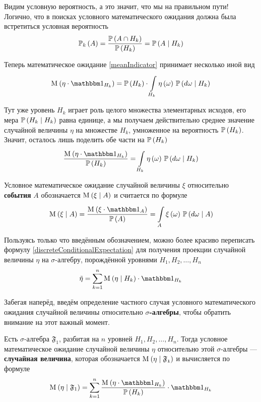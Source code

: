 Видим условную вероятность, а это значит, что мы на правильном пути!
Логично, что в поисках условного математического ожидания
должна была встретиться условная вероятность
$$\mathbb{P}_k\left( A \right)
    =\frac{\mathbb{P}\left( A\cap H_k \right)}{\mathbb{P}\left( H_k \right)}
    =\mathbb{P}\left( A \mid H_k \right)$$

Теперь математическое ожидание \eqref{meanIndicator}
принимает несколько иной вид
$$\mean{\left( \eta \cdot \indicatorof{H_k} \right)}
        = \probability{H_k}
            \cdot \integrall{H_k}{\probability{d\omega \mid H_k}}{
                \eta\left( \omega \right)}$$

Тут уже уровень $H_k$ играет роль целого множества элементарных исходов,
его мера $\mathbb{P}\left( H_k \mid H_k \right)$ равна единице,
а мы получаем действительно среднее значение случайной величины $\eta$
на множестве $H_k$, умноженное на вероятность $\mathbb{P}\left( H_k \right)$.
Значит, осталось лишь поделить обе части на $\mathbb{P}\left( H_k \right)$
$$\frac{\mean{\left( \eta \cdot \indicatorof{H_k} \right)}}{\probability{H_k}}
        = \integrall{H_k}{\probability{d\omega \mid H_k}}{
            \eta\left( \omega \right)}$$

\begin{definition}
Условное математическое
ожидание случайной величины $\xi$
относительно \textbf{события} $A$ \cite[стр.~68]{BorovkovPT}
обозначается $\mathrm{M}_{} \left( \xi \mid A \right)$ и считается по формуле
$$\mean{\left( \xi \mid A \right)}
    = \frac{\mean{\left( \xi \cdot \indicatorof{A} \right)}}{\probability{A}}
        = \integrall{A}{\probability{d\omega \mid A}}{
            \xi\left( \omega \right)}$$
\end{definition}

Пользуясь только что введённым обозначением,
можно более красиво переписать формулу \eqref{discreteConditionalExpectation}
для получения проекции случайной величины $\eta$ на $\sigma$-алгебру,
порождённой уровнями $H_1, H_2, \dots, H_n$ 
$$\tilde{\eta}
    = \sum_{k=1}^n \mean{\left( \eta \mid H_k \right)} \cdot \indicatorof{H_k}$$

Забегая наперёд,
введём определение частного случая условного математического ожидания
случайной величины относительно \textbf{$\sigma$-алгебры},
чтобы обратить внимание на этот важный момент.

\begin{definition}
    Есть $\sigma$-алгебра $\mathfrak{F}_1$,
    разбитая на $n$ уровней $H_1, H_2, \dots, H_n$.
    Тогда условное математическое ожидание случайной величины
    $\eta$ относительно этой $\sigma$-алгебры --- \textbf{случайная величина},
    которая обозначается $\mathrm{M}_{} \left( \eta \mid \mathfrak{F_1} \right)$
    и вычисляется по формуле
    $$\mean{\left( \eta \mid \mathfrak{F}_1 \right)}
        = \sum_{k=1}^n
            \frac{\mean{\left( \eta \cdot \indicatorof{H_k} \right)}}
                {\probability{H_k}}
            \cdot \indicatorof{H_k}$$
\end{definition}

